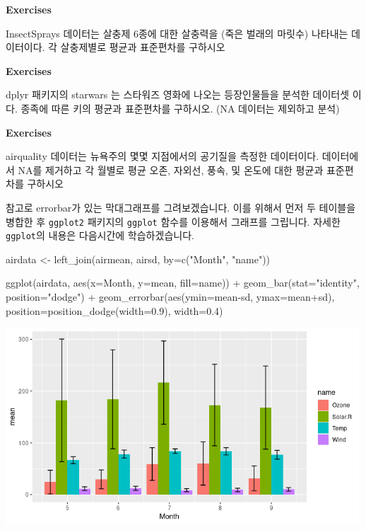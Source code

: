 \documentclass[
]{book}
\newenvironment{Shaded}{\begin{snugshade}}{\end{snugshade}}
\newcommand{\AttributeTok}[1]{\textcolor[rgb]{0.77,0.63,0.00}{#1}}
\newcommand{\FloatTok}[1]{\textcolor[rgb]{0.00,0.00,0.81}{#1}}
\newcommand{\FunctionTok}[1]{\textcolor[rgb]{0.00,0.00,0.00}{#1}}
\newcommand{\NormalTok}[1]{#1}
\newcommand{\OtherTok}[1]{\textcolor[rgb]{0.56,0.35,0.01}{#1}}
\newcommand{\SpecialCharTok}[1]{\textcolor[rgb]{0.00,0.00,0.00}{#1}}
\newcommand{\StringTok}[1]{\textcolor[rgb]{0.31,0.60,0.02}{#1}}
\begin{document}
\textbf{Exercises}

InsectSprays 데이터는 살충제 6종에 대한 살충력을 (죽은 벌래의 마릿수) 나타내는 데이터이다. 각 살충제별로 평균과 표준편차를 구하시오

\textbf{Exercises}

dplyr 패키지의 starwars 는 스타워즈 영화에 나오는 등장인물들을 분석한 데이터셋 이다. 종족에 따른 키의 평균과 표준편차를 구하시오. (NA 데이터는 제외하고 분석)

\textbf{Exercises}

airquality 데이터는 뉴욕주의 몇몇 지점에서의 공기질을 측정한 데이터이다. 데이터에서 NA를 제거하고 각 월별로 평균 오존, 자외선, 풍속, 및 온도에 대한 평균과 표준편차를 구하시오

참고로 errorbar가 있는 막대그래프를 그려보겠습니다. 이를 위해서 먼저 두 테이블을 병합한 후 \texttt{ggplot2} 패키지의 \texttt{ggplot} 함수를 이용해서 그래프를 그립니다. 자세한 \texttt{ggplot}의 내용은 다음시간에 학습하겠습니다.

\begin{Shaded}
\begin{Highlighting}[]

\NormalTok{airdata }\OtherTok{\textless{}{-}} \FunctionTok{left\_join}\NormalTok{(airmean, airsd, }\AttributeTok{by=}\FunctionTok{c}\NormalTok{(}\StringTok{"Month"}\NormalTok{, }\StringTok{"name"}\NormalTok{))}

\FunctionTok{ggplot}\NormalTok{(airdata, }\FunctionTok{aes}\NormalTok{(}\AttributeTok{x=}\NormalTok{Month, }\AttributeTok{y=}\NormalTok{mean, }\AttributeTok{fill=}\NormalTok{name)) }\SpecialCharTok{+}
  \FunctionTok{geom\_bar}\NormalTok{(}\AttributeTok{stat=}\StringTok{"identity"}\NormalTok{, }\AttributeTok{position=}\StringTok{"dodge"}\NormalTok{) }\SpecialCharTok{+}
  \FunctionTok{geom\_errorbar}\NormalTok{(}\FunctionTok{aes}\NormalTok{(}\AttributeTok{ymin=}\NormalTok{mean}\SpecialCharTok{{-}}\NormalTok{sd, }\AttributeTok{ymax=}\NormalTok{mean}\SpecialCharTok{+}\NormalTok{sd), }\AttributeTok{position=}\FunctionTok{position\_dodge}\NormalTok{(}\AttributeTok{width=}\FloatTok{0.9}\NormalTok{), }\AttributeTok{width=}\FloatTok{0.4}\NormalTok{)}
\end{Highlighting}
\end{Shaded}

\includegraphics[width=5.20833in,height=\textheight]{images/08/Rplot02.png}
\end{document}
